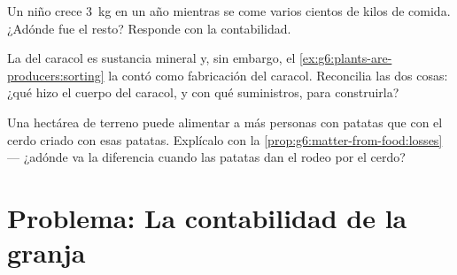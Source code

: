 \begin{exercise}[$\star\star$]\label{exo:g6:matter-from-food:10}
Un niño crece \qty{3}{kg} en un año mientras se come varios cientos de
kilos de comida. ¿Adónde fue el resto? Responde con la contabilidad.
\end{exercise}

\begin{exercise}[$\star\star$]\label{exo:g6:matter-from-food:11}
La  del caracol es sustancia mineral y, sin embargo, el
\cref{ex:g6:plants-are-producers:sorting} la contó como fabricación del
caracol. Reconcilia las dos cosas: ¿qué hizo el cuerpo del caracol, y
con qué suministros, para construirla?
\end{exercise}

\begin{exercise}[$\star\star\star$]\label{exo:g6:matter-from-food:12}
Una hectárea de terreno puede alimentar a más personas con patatas que
con el cerdo criado con esas patatas. Explícalo con la
\cref{prop:g6:matter-from-food:losses} --- ¿adónde va la diferencia
cuando las patatas dan el rodeo por el cerdo?
\end{exercise}

\section{Problema: La contabilidad de la granja}

